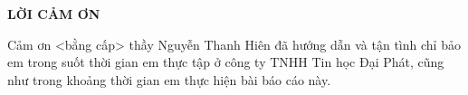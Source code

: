 \newpage
\changefontsizes{16pt}
\centerline{\textbf{LỜI CẢM ƠN}}

\changefontsizes{13pt}
\bigskip
\setlength{\parindent}{2cm}

Cảm ơn <bằng cấp> thầy Nguyễn Thanh Hiên đã hướng dẫn và tận tình chỉ bảo em trong suốt thời gian em thực tập ở công ty TNHH Tin học Đại Phát, cũng như trong khoảng thời gian em thực hiện bài báo cáo này.
    